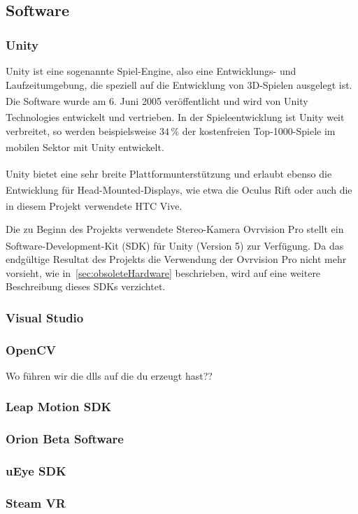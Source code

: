 \subsection{Software}
\subsubsection{Unity}\label{unity}
Unity ist eine sogenannte Spiel-Engine, also eine Entwicklungs- und Laufzeitumgebung, die speziell auf die Entwicklung von 3D-Spielen ausgelegt ist. Die Software wurde am 6. Juni 2005 veröffentlicht\textsuperscript{\cite{haas2014history}} und wird von Unity Technologies\textsuperscript{\cite{website:Unity}} entwickelt und vertrieben. In der Spieleentwicklung ist Unity weit verbreitet, so werden beispielsweise $34\,\%$ der kostenfreien Top-1000-Spiele im mobilen Sektor mit Unity entwickelt\textsuperscript{\cite{website:UnityPR}}.

Unity bietet eine sehr breite Plattformunterstützung\textsuperscript{\cite{website:UnityMultiPlatform}} und erlaubt ebenso die Entwicklung für Head-Mounted-Displays, wie etwa die Oculus Rift\textsuperscript{\cite{website:UnityOculus}\cite{website:UnityVRoverview}} oder auch die in diesem Projekt verwendete HTC Vive.\textsuperscript{\cite{website:UnityVRoverview}}

Die zu Beginn des Projekts verwendete Stereo-Kamera Ovrvision Pro stellt ein Software-Development-Kit (SDK) für Unity (Version 5) zur Verfügung.\textsuperscript{\cite{website:ovrvisionSetup}} Da das endgültige Resultat des Projekts die Verwendung der Ovrvision Pro nicht mehr vorsieht, wie in~\ref{sec:obsoleteHardware} beschrieben, wird auf eine weitere Beschreibung dieses SDKs verzichtet.

\subsubsection{Visual Studio} 
\subsubsection{OpenCV} 
Wo führen wir die dlls auf die du erzeugt hast??


\subsubsection{Leap Motion SDK} 


\subsubsection{Orion Beta Software} \label{OBS}

\subsubsection{uEye SDK}
\subsubsection{Steam VR}


\newpage